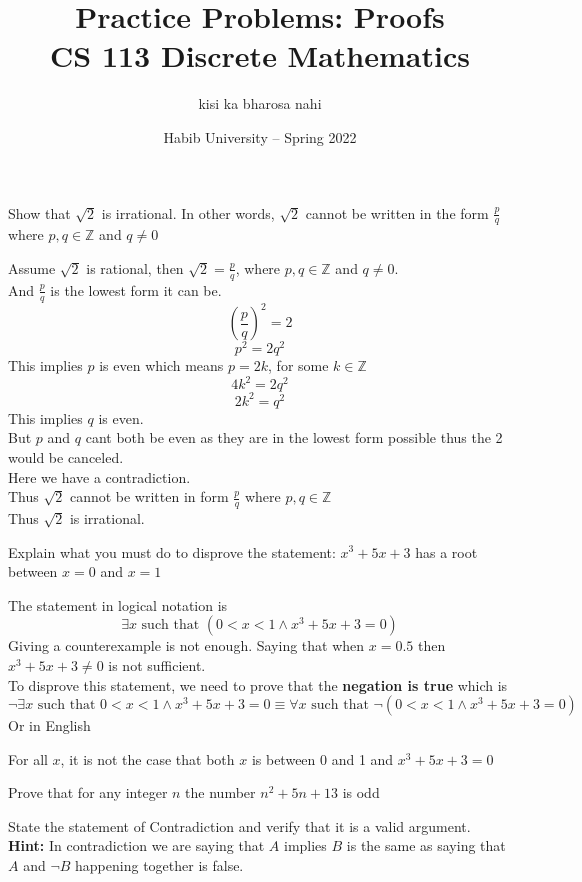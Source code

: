 \documentclass[addpoints]{exam}
\title{Practice Problems: Proofs\\ CS 113 Discrete Mathematics}
\author{kisi ka bharosa nahi}
\date{Habib University -- Spring 2022}
\begin{document}
\maketitle

\begin{questions}

\question Show that $\sqrt{2}$ is irrational. In other words, $\sqrt{2}$ cannot be written in the form $\frac{p}{q}$ where $p,q \in \mathbb{Z}$ and $q \neq 0$
\begin{solution}
Assume $\sqrt{2}$ is rational, then $\sqrt{2} = \frac{p}{q}$, where $p,q \in \mathbb{Z}$ and $q \neq 0$.
\\And $\frac{p}{q}$ is the lowest form it can be. 
$$\left(\frac{p}{q}\right)^2 = 2$$
$$p^2 = 2 q^2$$
This implies $p$ is even which means $p = 2k$, for some $k \in \mathbb{Z}$
$$4k^2 = 2 q^2$$
$$2k^2 = q^2$$
This implies $q$ is even.
\\But $p$ and $q$ cant both be even as they are in the lowest form possible thus the 2 would be canceled. 
\\Here we have a contradiction.
\\Thus $\sqrt{2}$ cannot be written in form $\frac{p}{q}$ where $p,q \in \mathbb{Z}$
\\Thus $\sqrt{2}$ is irrational.
\end{solution}


\question
Explain what you must do to disprove the statement:
  $x^3+5x + 3$ has a root between $x = 0$ and $x=1$
  \begin{solution}
  The statement in logical notation is 
  $$\exists x \text{ such that } (0<x<1 \land x^3+5x+3 = 0)$$
  Giving a counterexample is not enough. Saying that when $x=0.5$ then $x^3 +5x+3 \neq 0$ is not sufficient. \\
  To disprove this statement, we need to prove that the \textbf{negation is true} which is
  $$\neg \exists x \text{ such that } 0<x<1 \land x^3+5x+3 = 0 \equiv \forall x \text{ such that } \neg(0<x<1 \land x^3+5x+3 = 0)$$
  Or in English
  \begin{center}
      For all $x$, it is not the case that both $x$ is between 0 and 1 and $x^3+5x+3=0$
  \end{center}
      \end{solution}
\question Prove that for any integer $n$ the number $n^2+5n+13$ is odd
\begin{solution}
\end{solution}
\question State the statement of Contradiction and verify that it is a valid argument.\\
\textbf{Hint:} In contradiction we are saying that $A$ implies $B$ is the same as saying that $A$ and $\neg B$ happening together is false.
\begin{solution} 


\end{solution}
\end{questions}
\end{document}
